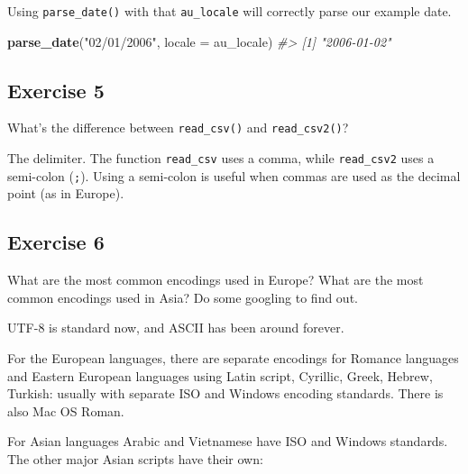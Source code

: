 \documentclass[]{book}
\newenvironment{Shaded}{\begin{snugshade}}{\end{snugshade}}
\newcommand{\CommentTok}[1]{\textcolor[rgb]{0.56,0.35,0.01}{\textit{#1}}}
\newcommand{\DataTypeTok}[1]{\textcolor[rgb]{0.13,0.29,0.53}{#1}}
\newcommand{\KeywordTok}[1]{\textcolor[rgb]{0.13,0.29,0.53}{\textbf{#1}}}
\newcommand{\NormalTok}[1]{#1}
\newcommand{\StringTok}[1]{\textcolor[rgb]{0.31,0.60,0.02}{#1}}
\theoremstyle{plain}
\theoremstyle{remark}
\theoremstyle{definition}
\theoremstyle{definition}
\theoremstyle{definition}
\theoremstyle{remark}
\begin{document}
\begin{Shaded}
\end{Shaded}

Using \texttt{parse\_date()} with that \texttt{au\_locale} will
correctly parse our example date.

\begin{Shaded}
\begin{Highlighting}[]
\KeywordTok{parse_date}\NormalTok{(}\StringTok{"02/01/2006"}\NormalTok{, }\DataTypeTok{locale =}\NormalTok{ au_locale)}
\CommentTok{#> [1] "2006-01-02"}
\end{Highlighting}
\end{Shaded}

\hypertarget{exercise-5-9}{%
\subsection{Exercise 5}\label{exercise-5-9}}

What's the difference between \texttt{read\_csv()} and
\texttt{read\_csv2()}?

The delimiter. The function \texttt{read\_csv} uses a comma, while
\texttt{read\_csv2} uses a semi-colon (\texttt{;}). Using a semi-colon
is useful when commas are used as the decimal point (as in Europe).

\hypertarget{exercise-6-8}{%
\subsection{Exercise 6}\label{exercise-6-8}}

What are the most common encodings used in Europe? What are the most
common encodings used in Asia? Do some googling to find out.

UTF-8 is standard now, and ASCII has been around forever.

For the European languages, there are separate encodings for Romance
languages and Eastern European languages using Latin script, Cyrillic,
Greek, Hebrew, Turkish: usually with separate ISO and Windows encoding
standards. There is also Mac OS Roman.

For Asian languages Arabic and Vietnamese have ISO and Windows
standards. The other major Asian scripts have their own:
\end{document}
